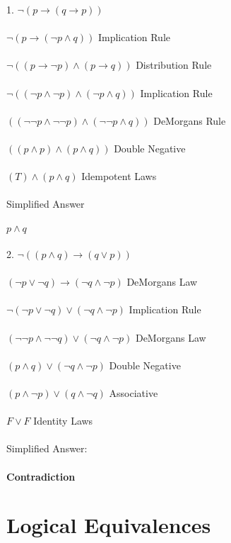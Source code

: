 \documentclass[11pt]{article}
\begin{document}
1. $ \neg ( p \rightarrow( q \rightarrow p )) $\\\\ 
$ \neg ( p \rightarrow( \neg p \land q)) $ 
Implication Rule \\\\
$ \neg (( p \rightarrow \neg p ) \land (p \rightarrow q )) $
Distribution Rule \\\\
$ \neg (( \neg p \land \neg p) \land (\neg p \land q)) $ 
Implication Rule \\\\
$ (( \neg \neg p \land \neg \neg p) \land ( \neg \neg p \land q)) $
DeMorgans Rule \\\\
$ ((p \land p) \land ( p \land q )) $ 
Double Negative \\\\
$ (T) \land (p \land q) $ 
Idempotent Laws \\\\
Simplified Answer \\\\
$ p \land q $ \\\\



2. $\neg ((p \land q) \rightarrow (q \lor p))$\\\\
$ (\neg p \lor \neg q) \rightarrow ( \neg q \land \neg p)$
DeMorgans Law \\\\
$ \neg ( \neg p \lor \neg q) \lor (\neg q \land \neg p) $ 
Implication Rule \\\\
$ ( \neg \neg p \land \neg \neg q) \lor ( \neg q \land \neg p) $ 
DeMorgans Law \\\\
$ (p \land q ) \lor ( \neg q \land \neg p) $ 
Double Negative \\\\
$ (p \land \neg p) \lor ( q \land \neg q) $
Associative \\\\
$ F \lor F $ 
Identity Laws \\\\
Simplified Answer: \\\\
\textbf {Contradiction}

\section{Logical Equivalences}
\end{document}
